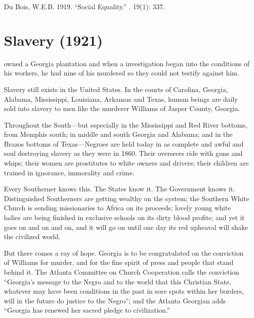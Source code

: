 \documentclass[letterpaper,10pt,english]{jupyterBook}
\begin{document}
\sphinxAtStartPar
{} Du Bois, W.E.B. 1919. “Social Equality.” . 19(1): 337.


\section{Slavery (1921)}
\label{\detokenize{Volumes/24/01/slavery:slavery-1921}}\label{\detokenize{Volumes/24/01/slavery::doc}}
\begin{sphinxShadowBox}
\sphinxstylesidebartitle{}

\sphinxAtStartPar
{} owned a Georgia plantation and when a investigation began into the conditions of his workers, he had nine of his  murdered so they could not testify against him.
\end{sphinxShadowBox}

\sphinxAtStartPar
Slavery still exists in the United States. In the courts of Carolina, Georgia, Alabama, Mississippi, Louisiana, Arkansas and Texas, human beings are daily sold into slavery to men like the murderer Williams of Jasper County, Georgia.

\sphinxAtStartPar
Throughout the South—but especially in the Mississippi and Red River bottoms, from Memphis south; in middle and south Georgia and Ala­bama; and in the Brazos bottoms of Texas—Negroes are held today in as complete and awful and soul destroying slavery as they were in 1860. Their overseers ride with guns and whips; their women are prostitutes to white owners and drivers; their children are trained in ignorance, im­morality and crime.

\sphinxAtStartPar
Every Southerner knows this. The States know it. The Government knows it. Distinguished Southerners are getting wealthy on the system; the Southern White Church is sending missionaries to Africa on its proceeds; lovely young white ladies are being finished in exclusive schools on its dirty blood profits; and yet it goes on and on and on, and it will go on until one day its red upheaval will shake the civilized world.

\sphinxAtStartPar
But there comes a ray of hope. Georgia is to be congratulated on the conviction of Williams for murder, and for the fine spirit of press and people that stand behind it. The Atlanta Committee on Church Cooperation calls the conviction “Georgia’s message to the Negro and to the world that this Christian State, whatever may have been conditions in the past in sore spots within her borders, will in the future do justice to the Negro”; and the Atlanta Georgian adds “Georgia has renewed her sacred pledge to civilization.”
\end{document}
